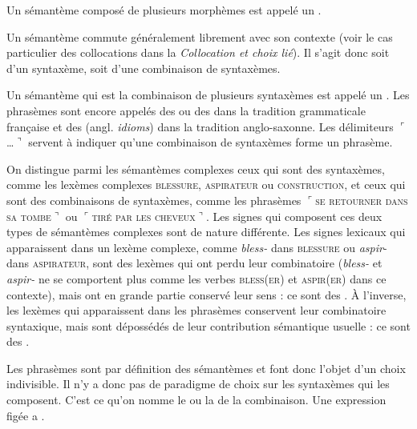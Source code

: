 {Un sémantème composé de plusieurs morphèmes est appelé un .}

Un sémantème commute généralement librement avec son contexte (voir le cas particulier des collocations dans la  \textit{Collocation et choix lié}). Il s’agit donc soit d’un syntaxème, soit d’une combinaison de syntaxèmes.

{Un sémantème qui est la combinaison de plusieurs syntaxèmes est appelé un . Les phrasèmes sont encore appelés des  ou des  dans la tradition grammaticale française et des  (angl. \textit{idioms}) dans la tradition anglo-saxonne. Les délimiteurs $⌜$…$⌝$ servent à indiquer qu’une combinaison de syntaxèmes forme un phrasème.}


On distingue parmi les sémantèmes complexes ceux qui sont des syntaxèmes, comme les lexèmes complexes \textsc{blessure,} \textsc{aspirateur} ou \textsc{construction,} et ceux qui sont des combinaisons de syntaxèmes, comme les phrasèmes $⌜$\textsc{se} \textsc{retourner} \textsc{dans} \textsc{sa} \textsc{tombe}$⌝$ ou $⌜$\textsc{tiré} \textsc{par} \textsc{les} \textsc{cheveux}$⌝$. Les signes qui composent ces deux types de sémantèmes complexes sont de nature différente. Les signes lexicaux qui apparaissent dans un lexème complexe, comme \textit{bless-} dans \textsc{blessure} ou \textit{aspir}{}- dans \textsc{aspirateur}, sont des lexèmes qui ont perdu leur combinatoire (\textit{bless-} et \textit{aspir-} ne se comportent plus comme les verbes \textsc{bless}(\textsc{er}) et \textsc{aspir}(\textsc{er}) dans ce contexte), mais ont en grande partie conservé leur sens : ce sont des . À l’inverse, les lexèmes qui apparaissent dans les phrasèmes conservent leur combinatoire syntaxique, mais sont dépossédés de leur contribution sémantique usuelle : ce sont des .

Les phrasèmes sont par définition des sémantèmes et font donc l’objet d’un choix indivisible. Il n’y a donc pas de paradigme de choix sur les syntaxèmes qui les composent. C’est ce qu’on nomme le  ou la  de la combinaison. Une expression figée a .

